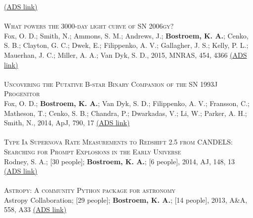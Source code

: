 \color{blue}\href{https://ui.adsabs.harvard.edu/#abs/2016MNRAS.458..624C/abstract}{(ADS link)}\color{black}\\
\\
\textsc{What powers the 3000-day light curve of SN 2006gy?}\\ 
Fox, O. D.; Smith, N.; Ammons, S. M.; Andrews, J.; {\bf Bostroem, K. A.}; Cenko, S. B.; Clayton, G. C.; Dwek, E.; Filippenko, A. V.; Gallagher, J. S.; Kelly, P. L.; Mauerhan, J. C.; Miller, A. A.; Van Dyk, S. D., 2015, MNRAS, 454, 4366
\color{blue}\href{https://ui.adsabs.harvard.edu/#abs/2015MNRAS.454.4366F/abstract}{(ADS link)}\color{black}\\
\\
\textsc{Uncovering the Putative B-star Binary Companion of the SN 1993J Progenitor}\\
Fox, O. D.; {\bf Bostroem, K. A.}; Van Dyk, S. D.; Filippenko, A. V.; Fransson, C.; Matheson, T.; Cenko, S. B.; Chandra, P.; Dwarkadas, V.; Li, W.; Parker, A. H.; Smith, N., 2014, ApJ, 790, 17
\color{blue}\href{https://ui.adsabs.harvard.edu/#abs/2014ApJ...790...17F/abstract}{(ADS link)}\color{black}\\
\\
\textsc{Type Ia Supernova Rate Measurements to Redshift 2.5 from CANDELS: Searching for Prompt Explosions in the Early Universe}\\ 
Rodney, S. A.; [30 people]; {\bf Bostroem, K. A.}; [6 people], 2014, AJ, 148, 13
\color{blue}\href{https://ui.adsabs.harvard.edu/#abs/2014AJ....148...13R/abstract}{(ADS link)}\color{black}\\
\\
\textsc{Astropy: A community Python package for astronomy}\\ 
Astropy Collaboration; [29 people]; {\bf Bostroem, K. A.}; [14 people], 2013, A\&A, 558, A33
\color{blue}\href{https://ui.adsabs.harvard.edu/#abs/2013A\%26A...558A..33A/abstract}{(ADS link)}\color{black} \\































